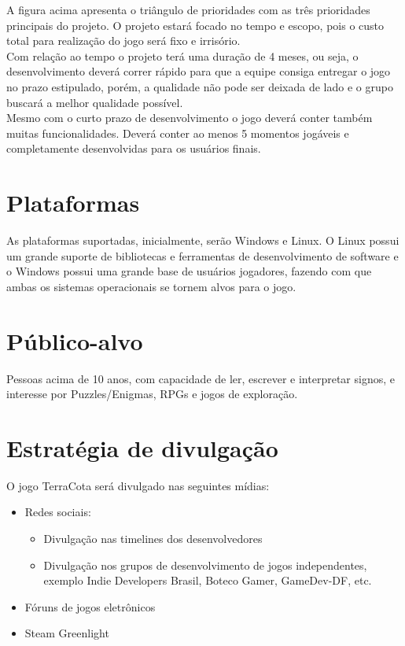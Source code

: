 \documentclass[a4paper,11pt]{article}
\begin{document}
A figura acima apresenta o triângulo de prioridades com as três prioridades principais do projeto. O projeto estará focado no tempo e escopo, pois o custo total para realização do jogo será fixo e irrisório. \\
Com relação ao tempo o projeto terá uma duração de 4 meses, ou seja, o desenvolvimento deverá correr rápido para que a equipe consiga entregar o jogo no prazo estipulado, porém, a qualidade não pode ser deixada de lado e o grupo buscará a melhor qualidade possível. \\
Mesmo com o curto prazo de desenvolvimento o jogo deverá conter também muitas funcionalidades. Deverá conter ao menos 5 momentos jogáveis e completamente desenvolvidas para os usuários finais.

\section{Plataformas}

As plataformas suportadas, inicialmente, serão Windows e Linux.
O Linux possui um grande suporte de bibliotecas e ferramentas de desenvolvimento de software e o Windows possui uma grande base de usuários jogadores, fazendo com que ambas os sistemas operacionais se tornem alvos para o jogo.


\section{Público-alvo}
Pessoas acima de 10 anos, com capacidade de ler, escrever e interpretar signos, e interesse por Puzzles/Enigmas, RPGs e jogos de exploração.

\section{Estratégia de divulgação}

O jogo TerraCota será divulgado nas seguintes mídias:
\begin{itemize}
  \item Redes sociais:
  \begin{itemize}
    \item Divulgação nas timelines dos desenvolvedores
    \item Divulgação nos grupos de desenvolvimento de jogos independentes, exemplo Indie Developers Brasil, Boteco Gamer, GameDev-DF, etc.
  \end{itemize}
  \item Fóruns de jogos eletrônicos
  \item Steam Greenlight
\end{itemize}
\end{document}
